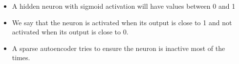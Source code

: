 

\begin{frame}
\end{frame}

\begin{frame}
  \begin{columns}
    \begin{overlayarea}{\textwidth}{\textheight}
        \vspace{-0.2cm}
        
    \end{overlayarea}

    \begin{overlayarea}{\textwidth}{\textheight}
        \begin{itemize}\justifying
            \item<2-> A hidden neuron with sigmoid activation will have values between 0 and 1
            \item<3->We say that the neuron is activated when its output is close to 1  and not activated when its output is close to 0.  
            \item<4-> A sparse autoencoder tries to ensure the neuron is inactive most of the times.
        \end{itemize}
    \end{overlayarea}
  \end{columns}
\end{frame}

